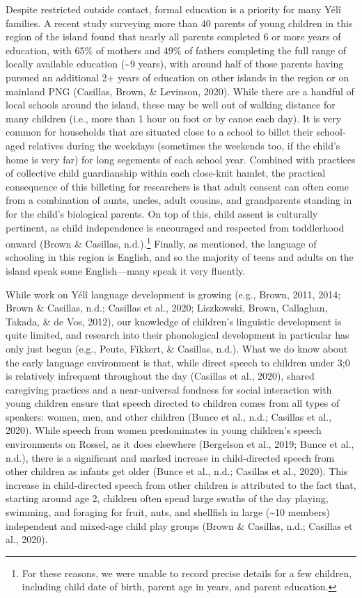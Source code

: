 \documentclass[english,,man,floatsintext]{apa6}
\begin{document}
Despite restricted outside contact, formal education is a priority for many Yélî families. A recent study surveying more than 40 parents of young children in this region of the island found that nearly all parents completed 6 or more years of education, with 65\% of mothers and 49\% of fathers completing the full range of locally available education (\textasciitilde{}9 years), with around half of those parents having pursued an additional 2+ years of education on other islands in the region or on mainland PNG (Casillas, Brown, \& Levinson, 2020). While there are a handful of local schools around the island, these may be well out of walking distance for many children (i.e., more than 1 hour on foot or by canoe each day). It is very common for households that are situated close to a school to billet their school-aged relatives during the weekdays (sometimes the weekends too, if the child's home is very far) for long segements of each school year. Combined with practices of collective child guardianship within each close-knit hamlet, the practical consequence of this billeting for researchers is that adult consent can often come from a combination of aunts, uncles, adult cousins, and grandparents standing in for the child's biological parents. On top of this, child assent is culturally pertinent, as child independence is encouraged and respected from toddlerhood onward (Brown \& Casillas, n.d.).\footnote{For these reasons, we were unable to record precise details for a few children, including child date of birth, parent age in years, and parent education.} Finally, as mentioned, the language of schooling in this region is English, and so the majority of teens and adults on the island speak some English---many speak it very fluently.

While work on Yélî language development is growing (e.g., Brown, 2011, 2014; Brown \& Casillas, n.d.; Casillas et al., 2020; Liszkowski, Brown, Callaghan, Takada, \& de Vos, 2012), our knowledge of children's linguistic development is quite limited, and research into their phonological development in particular has only just begun (e.g., Peute, Fikkert, \& Casillas, n.d.). What we do know about the early language environment is that, while direct speech to children under 3;0 is relatively infrequent throughout the day (Casillas et al., 2020), shared caregiving practices and a near-universal fondness for social interaction with young children ensure that speech directed to children comes from all types of speakers: women, men, and other children (Bunce et al., n.d.; Casillas et al., 2020). While speech from women predominates in young children's speech environments on Rossel, as it does elsewhere (Bergelson et al., 2019; Bunce et al., n.d.), there is a significant and marked increase in child-directed speech from other children as infants get older (Bunce et al., n.d.; Casillas et al., 2020). This increase in child-directed speech from other children is attributed to the fact that, starting around age 2, children often spend large swaths of the day playing, swimming, and foraging for fruit, nuts, and shellfish in large (\textasciitilde{}10 members) independent and mixed-age child play groups (Brown \& Casillas, n.d.; Casillas et al., 2020).
\end{document}
